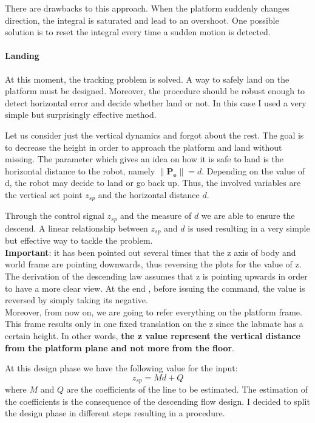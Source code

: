 There are drawbacks to this approach. When the platform suddenly changes direction, the integral is saturated and lead to an overshoot. One possible solution is to reset the integral every time a sudden motion is detected.

\paragraph{Landing}

At this moment, the tracking problem is solved. A way to safely land on the platform must be designed. Moreover, the procedure should be robust enough to detect horizontal error and decide whether land or not. In this case I used a very simple but surprisingly effective method. 

Let us consider just the vertical dynamics and forgot about the rest. The goal is to decrease the height in order to approach the platform and land without missing. The parameter which gives an idea on how it is safe to land is the horizontal distance to the robot, namely $\lVert \boldsymbol{P_e} \rVert = d$. Depending on the value of d, the robot may decide to land or go back up. Thus, the involved variables are the vertical set point $z_{sp}$ and the horizontal distance $d$. 

Through the control signal $z_{sp}$ and the measure of $d$ we are able to ensure the descend. A linear relationship between $z_{sp}$ and $d$ is used resulting in a very simple but effective way to tackle the problem.\\

\noindent
\textbf{Important}: it has been pointed out several times that the z axis of body and world frame are pointing downwards, thus reversing the plots for the value of z. The derivation of the descending law assumes that z is pointing upwards in order to have a more clear view. At the end , before issuing the command, the value is reversed by simply taking its negative. \\

\noindent
Moreover, from now on, we are going to refer everything on the platform frame. This frame results only in one fixed translation on the z since the labmate has a certain height. In other words, \textbf{the z value represent the vertical distance from the platform plane and not more from the floor}. 

At this design phase we have the following value for the input:
\begin{equation}
	z_{sp} = M d + Q
	\label{eq:line}
\end{equation}
where $M$ and $Q$ are the coefficients of the line to be estimated. The estimation of the coefficients is the consequence of the descending flow design. I decided to split the design phase in different steps resulting in a procedure. 

